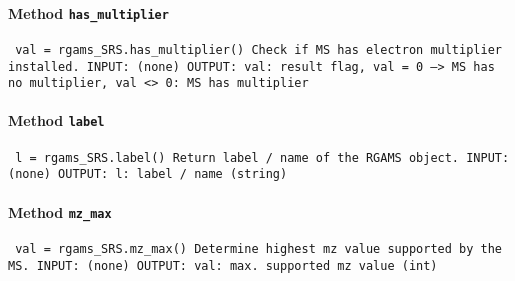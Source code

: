 \paragraph{Method \texttt{has_multiplier}}
\vspace{1ex}
\texttt{\newline
val = rgams_SRS.has_multiplier()\newline
\newline
Check if MS has electron multiplier installed.\newline
\newline
INPUT:\newline
(none)\newline
\newline
OUTPUT:\newline
val: result flag, val = 0 --> MS has no multiplier, val <> 0: MS has multiplier\newline
\newline
}

\paragraph{Method \texttt{label}}
\vspace{1ex}
\texttt{\newline
l = rgams_SRS.label()\newline
\newline
Return label / name of the RGAMS object.\newline
\newline
INPUT:\newline
(none)\newline
\newline
OUTPUT:\newline
l: label / name (string)\newline
\newline
}

\paragraph{Method \texttt{mz_max}}
\vspace{1ex}
\texttt{\newline
val = rgams_SRS.mz_max()\newline
\newline
Determine highest mz value supported by the MS.\newline
\newline
INPUT:\newline
(none)\newline
\newline
OUTPUT:\newline
val: max. supported mz value (int)\newline
\newline
}


